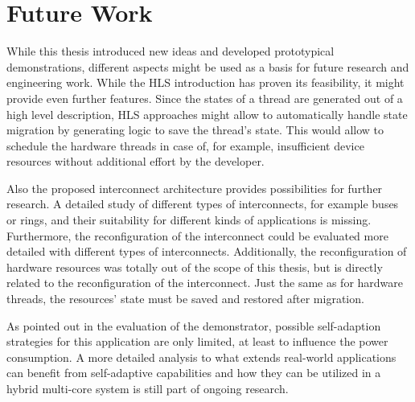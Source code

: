 \section{Future Work}
While this thesis introduced new ideas and developed prototypical
demonstrations, different aspects might be used as a basis for future research
and engineering work. While the \ac{HLS} introduction has proven its
feasibility, it might provide even further features. Since the states of a
thread are generated out of a high level description, \ac{HLS} approaches
might allow to automatically handle state migration by generating logic to
save the thread's state. This would allow to schedule the hardware threads in
case of, for example, insufficient device resources without additional effort
by the developer.

Also the proposed interconnect architecture provides possibilities for further
research. A detailed study of different types of interconnects, for example
buses or rings, and their suitability for different kinds of applications is
missing. Furthermore, the reconfiguration of the interconnect could be
evaluated more detailed with different types of interconnects. Additionally,
the reconfiguration of hardware resources was totally out of the scope of this
thesis, but is directly related to the reconfiguration of the interconnect.
Just the same as for hardware threads, the resources' state must be saved and
restored after migration.

As pointed out in the evaluation of the demonstrator, possible self-adaption
strategies for this application are only limited, at least to influence the
power consumption. A more detailed analysis to what extends real-world
applications can benefit from self-adaptive capabilities and how they can be
utilized in a hybrid multi-core system is still part of ongoing research.

